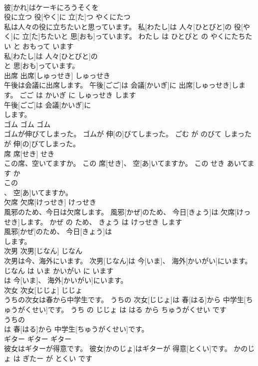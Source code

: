 \documentclass[8pt]{extreport}
\begin{document}
\begin{CJK}{UTF8}{min}
\\	彼[かれ]はケーキにろうそくを
\\	役に立つ	役[やく]に 立[た]つ	やくにたつ	
\\	私は人々の役に立ちたいと思っています。	私[わたし]は 人々[ひとびと]の 役[やく]に 立[た]ちたいと 思[おも]っています。	わたし は ひとびと の やくにたちたい と おもって います	
\\	私[わたし]は 人々[ひとびと]の
\\	と 思[おも]っています。		
\\	出席	出席[しゅっせき]	しゅっせき	
\\	午後は会議に出席します。	午後[ごご]は 会議[かいぎ]に 出席[しゅっせき]します。	ごご は かいぎ に しゅっせき します	
\\	午後[ごご]は 会議[かいぎ]に
\\	します。		
\\	ゴム	ゴム	ゴム	
\\	ゴムが伸びてしまった。	ゴムが 伸[の]びてしまった。	ごむ が のびて しまった	
\\	が 伸[の]びてしまった。		
\\	席	席[せき]	せき	
\\	この席、空いてますか。	この 席[せき]、 空[あ]いてますか。	この せき あいてます か	
\\	この
\\	、 空[あ]いてますか。		
\\	欠席	欠席[けっせき]	けっせき	
\\	風邪のため、今日は欠席します。	風邪[かぜ]のため、 今日[きょう]は 欠席[けっせき]します。	かぜ の ため、 きょう は けっせき します	
\\	風邪[かぜ]のため、 今日[きょう]は
\\	します。		
\\	次男	次男[じなん]	じなん	
\\	次男は今、海外にいます。	次男[じなん]は 今[いま]、 海外[かいがい]にいます。	じなん は いま かいがい に います	
\\	は 今[いま]、 海外[かいがい]にいます。		
\\	次女	次女[じじょ]	じじょ	
\\	うちの次女は春から中学生です。	うちの 次女[じじょ]は 春[はる]から 中学生[ちゅうがくせい]です。	うち の じじょ は はる から ちゅうがくせい です	
\\	うちの
\\	は 春[はる]から 中学生[ちゅうがくせい]です。		
\\	ギター	ギター	ギター	
\\	彼女はギターが得意です。	彼女[かのじょ]はギターが 得意[とくい]です。	かのじょ は ぎたー が とくい です	

\end{CJK}
\end{document}
